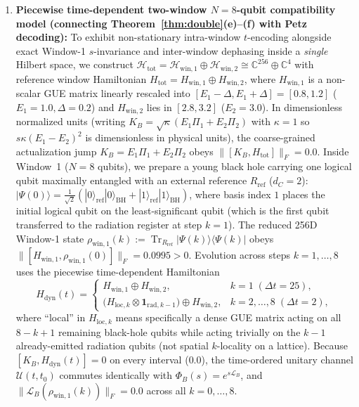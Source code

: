 \documentclass[11pt,a4paper]{article}
\theoremstyle{definition}
\theoremstyle{remark}
\newcommand{\Tr}{\operatorname{Tr}}
\newcommand{\cH}{\mathcal{H}}
\newcommand{\cL}{\mathcal{L}}
\newcommand{\cU}{\mathcal{U}}
\newcommand{\bbC}{\mathbb{C}}
\newcommand{\1}{\mathbf{1}}
\newcommand{\normF}[1]{\|#1\|_F}
\begin{document}
\begin{enumerate}
  \item \textbf{Piecewise time-dependent two-window $N=8$-qubit compatibility model (connecting Theorem~\ref{thm:double}(e)--(f) with Petz decoding):}
  To exhibit non-stationary intra-window $t$-encoding alongside exact Window-1 $s$-invariance and inter-window dephasing inside a \emph{single} Hilbert space, we construct $\cH_{\mathrm{tot}} = \cH_{\mathrm{win},1} \oplus \cH_{\mathrm{win},2} \cong \bbC^{256} \oplus \bbC^4$ with reference window Hamiltonian $H_{\mathrm{tot}} = H_{\mathrm{win},1} \oplus H_{\mathrm{win},2}$, where $H_{\mathrm{win},1}$ is a non-scalar GUE matrix linearly rescaled into $[E_1-\Delta, E_1+\Delta] = [0.8, 1.2]$ ($E_1=1.0, \Delta=0.2$) and $H_{\mathrm{win},2}$ lies in $[2.8, 3.2]$ ($E_2=3.0$). In dimensionless normalized units (writing $K_B = \sqrt{\kappa}(E_1\Pi_1 + E_2\Pi_2)$ with $\kappa=1$ so $s\kappa(E_1-E_2)^2$ is dimensionless in physical units), the coarse-grained actualization jump $K_B = E_1\Pi_1 + E_2\Pi_2$ obeys $\normF{[K_B, H_{\mathrm{tot}}]} = 0.0$.
  Inside Window~1 ($N=8$ qubits), we prepare a young black hole carrying one logical qubit maximally entangled with an external reference $R_{\mathrm{ref}}$ ($d_C=2$): $|\Psi(0)\rangle = \frac{1}{\sqrt{2}}(|0\rangle_{\mathrm{ref}}|0\rangle_{\mathrm{BH}} + |1\rangle_{\mathrm{ref}}|1\rangle_{\mathrm{BH}})$, where basis index $1$ places the initial logical qubit on the least-significant qubit (which is the first qubit transferred to the radiation register at step $k=1$). The reduced 256D Window-1 state $\rho_{\mathrm{win},1}(k) := \Tr_{R_{\mathrm{ref}}}|\Psi(k)\rangle\langle\Psi(k)|$ obeys $\normF{[H_{\mathrm{win},1}, \rho_{\mathrm{win},1}(0)]} = 0.0995 > 0$. Evolution across steps $k=1,\dots,8$ uses the piecewise time-dependent Hamiltonian
  \[
    H_{\mathrm{dyn}}(t) =
    \begin{cases}
      H_{\mathrm{win},1} \oplus H_{\mathrm{win},2}, & k = 1\;(\Delta t = 25),\\
      \bigl(H_{\mathrm{loc},k} \otimes \1_{\mathrm{rad},k-1}\bigr) \oplus H_{\mathrm{win},2}, & k = 2,\dots,8\;(\Delta t = 2),
    \end{cases}
  \]
  where ``local'' in $H_{\mathrm{loc},k}$ means specifically a dense GUE matrix acting on all $8-k+1$ remaining black-hole qubits while acting trivially on the $k-1$ already-emitted radiation qubits (not spatial $k$-locality on a lattice). Because $[K_B, H_{\mathrm{dyn}}(t)] = 0$ on every interval ($0.0$), the time-ordered unitary channel $\cU(t,t_0)$ commutes identically with $\Phi_B(s) = e^{s\cL_B}$, and $\normF{\cL_B(\rho_{\mathrm{win},1}(k))} = 0.0$ across all $k=0,\dots,8$.

\end{enumerate}
\end{document}
